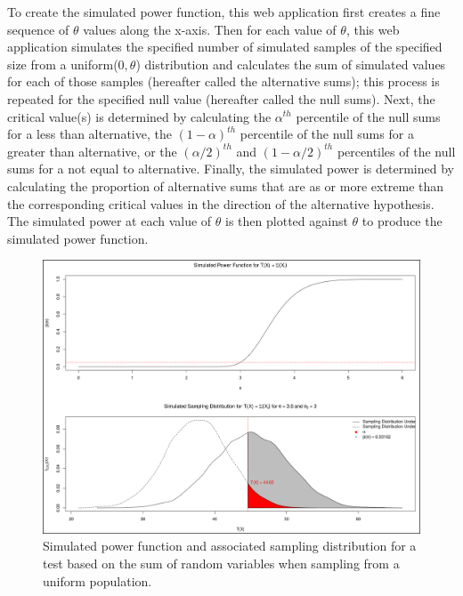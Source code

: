 \documentclass{TISE}
\begin{document}
To create the simulated power function, this web application first  creates a fine sequence of $\theta$ values along the x-axis. Then for each value of $\theta$, this web application simulates the specified number of simulated samples of the specified size from a uniform($0, \theta$) distribution and calculates the sum of simulated values for each of those samples (hereafter called the alternative sums); this process is repeated for the specified null value (hereafter called the null sums). Next, the critical value(s) is determined by calculating the $\alpha^{th}$ percentile of the null sums for a less than alternative, the $(1 - \alpha)^{th}$ percentile of the null sums for a greater than alternative, or the $(\alpha/2)^{th}$ and $(1 - \alpha/2)^{th}$ percentiles of the null sums for a not equal to alternative. Finally, the simulated power is determined by calculating the proportion of alternative sums that are as or more extreme than the corresponding critical values in the direction of the alternative hypothesis. The simulated power at each value of $\theta$ is then plotted against $\theta$ to produce the simulated power function. 

\begin{figure}[H]
	\centering
	\includegraphics[width=\textwidth]{sim.png}
	\caption{Simulated power function and associated sampling distribution for a test based on the sum of random variables when sampling from a uniform population.}
\end{figure}
 
\end{document}
